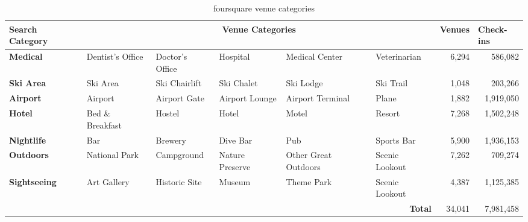\begin{sidewaystable}[]
\centering
\caption{foursquare venue categories}
\label{table:foursquare_categories}

\centering %

\begin{tabular}{lrrrrrrr}
\toprule
Search Category & \multicolumn{5}{c}{Venue Categories}  & \multicolumn{1}{l}{Venues} & \multicolumn{1}{l}{Check-ins} \\
\midrule
\textbf{Medical} & \multicolumn{1}{l}{Dentist's Office} & \multicolumn{1}{l}{Doctor's Office} & \multicolumn{1}{l}{Hospital} & \multicolumn{1}{l}{Medical Center} & \multicolumn{1}{l}{Veterinarian} &          6,294  &              586,082  \\
\textbf{Ski Area} & \multicolumn{1}{l}{Ski Area} & \multicolumn{1}{l}{Ski Chairlift} & \multicolumn{1}{l}{Ski Chalet} & \multicolumn{1}{l}{Ski Lodge} & \multicolumn{1}{l}{Ski Trail} &          1,048  &              203,266  \\
\textbf{Airport} & \multicolumn{1}{l}{Airport} & \multicolumn{1}{l}{Airport Gate} & \multicolumn{1}{l}{Airport Lounge} & \multicolumn{1}{l}{Airport Terminal} & \multicolumn{1}{l}{Plane} &          1,882  &          1,919,050  \\
\textbf{Hotel} & \multicolumn{1}{l}{Bed \& Breakfast} & \multicolumn{1}{l}{Hostel} & \multicolumn{1}{l}{Hotel} & \multicolumn{1}{l}{Motel} & \multicolumn{1}{l}{Resort} &          7,268  &          1,502,248  \\
\textbf{Nightlife} & \multicolumn{1}{l}{Bar} & \multicolumn{1}{l}{Brewery} & \multicolumn{1}{l}{Dive Bar} & \multicolumn{1}{l}{Pub} & \multicolumn{1}{l}{Sports Bar} &          5,900  &          1,936,153  \\
\textbf{Outdoors }& \multicolumn{1}{l}{National Park} & \multicolumn{1}{l}{Campground} & \multicolumn{1}{l}{Nature Preserve} & \multicolumn{1}{l}{Other Great Outdoors} & \multicolumn{1}{l}{Scenic Lookout} &          7,262  &              709,274  \\
\textbf{Sightseeing} & \multicolumn{1}{l}{Art Gallery} & \multicolumn{1}{l}{Historic Site} & \multicolumn{1}{l}{Museum} & \multicolumn{1}{l}{Theme Park} & \multicolumn{1}{l}{Scenic Lookout} &          4,387  &          1,125,385  \\
\midrule
&       &       &       &       &   \textbf{Total}     &       34,041  &          7,981,458  \\
\end{tabular}%

\end{sidewaystable}


